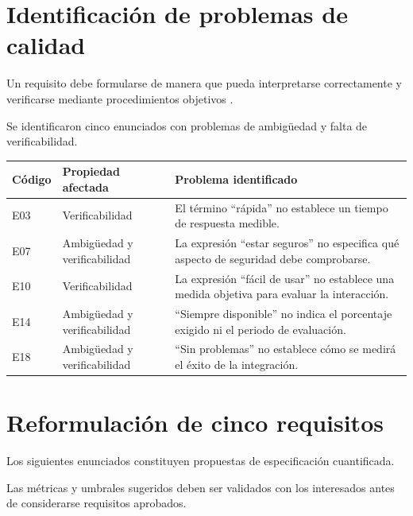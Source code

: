 \documentclass[12pt,a4paper]{article}
\begin{document}
\section{Identificación de problemas de calidad}

Un requisito debe formularse de manera que
pueda interpretarse correctamente y
verificarse mediante procedimientos
objetivos \cite{iso29148}.

Se identificaron cinco enunciados
con problemas de ambigüedad y
falta de verificabilidad.

\begin{longtable}{
P{1.4cm}
P{4.0cm}
P{10.4cm}
}

\toprule

\textbf{Código} &
\textbf{Propiedad afectada} &
\textbf{Problema identificado}\\

\midrule
\endhead

E03 &
Verificabilidad &
El término ``rápida'' no establece
un tiempo de respuesta medible.\\

E07 &
Ambigüedad y verificabilidad &
La expresión ``estar seguros''
no especifica qué aspecto de
seguridad debe comprobarse.\\

E10 &
Verificabilidad &
La expresión ``fácil de usar''
no establece una medida objetiva
para evaluar la interacción.\\

E14 &
Ambigüedad y verificabilidad &
``Siempre disponible'' no indica
el porcentaje exigido ni el
periodo de evaluación.\\

E18 &
Ambigüedad y verificabilidad &
``Sin problemas'' no establece
cómo se medirá el éxito de
la integración.\\

\bottomrule

\end{longtable}

\section{Reformulación de cinco requisitos}

Los siguientes enunciados constituyen
propuestas de especificación cuantificada.

Las métricas y umbrales sugeridos deben
ser validados con los interesados antes
de considerarse requisitos aprobados.
\end{document}
